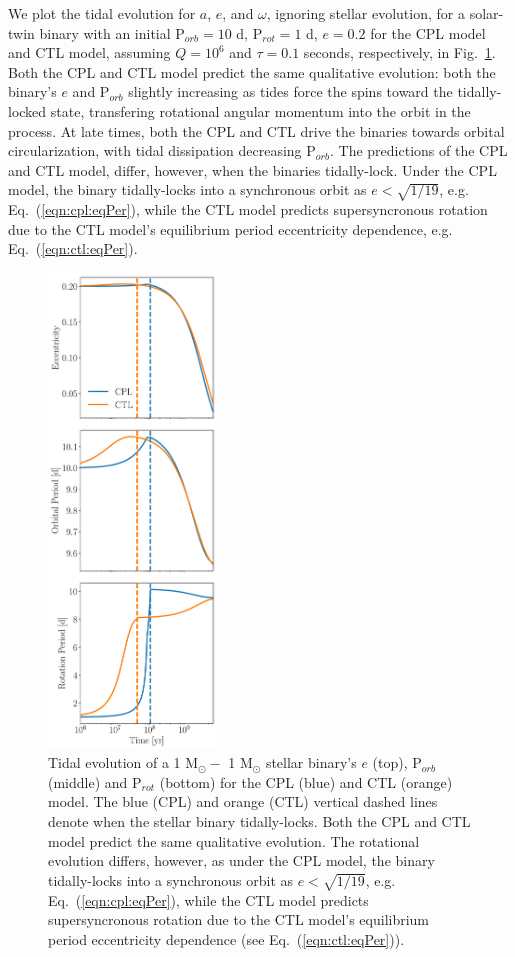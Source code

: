 \documentclass[twocolumn]{aastex61}
\begin{document}
We plot the tidal evolution for $a$, $e$, and $\omega$, ignoring stellar evolution, for a solar-twin binary with an initial P$_{orb} = 10$ d, P$_{rot} = 1$ d, $e = 0.2$ for the CPL model and CTL model, assuming $Q=10^6$ and $\tau = 0.1$ seconds, respectively, in Fig.~\ref{fig:tidalExample}. Both the CPL and CTL model predict the same qualitative evolution: both the binary's $e$ and P$_{orb}$ slightly increasing as tides force the spins toward the tidally-locked state, transfering rotational angular momentum into the orbit in the process.  At late times, both the CPL and CTL drive the binaries towards orbital circularization, with tidal dissipation decreasing P$_{orb}$. The predictions of the CPL and CTL model, differ, however, when the binaries tidally-lock.  Under the CPL model, the binary tidally-locks into a synchronous orbit as $e < \sqrt{1/19}$, e.g. Eq.~(\ref{eqn:cpl:eqPer}), while the CTL model predicts supersyncronous rotation due to the CTL model's equilibrium period eccentricity dependence, e.g. Eq.~(\ref{eqn:ctl:eqPer}).

\begin{figure}
	\includegraphics[width=0.4\textwidth]{../Plots/tidalExample.pdf}
   \caption{Tidal evolution of a 1 M$_{\odot} -$ 1 M$_{\odot}$ stellar binary's $e$ (top), P$_{orb}$ (middle) and P$_{rot}$ (bottom) for the CPL (blue) and CTL (orange) model. The blue (CPL) and orange (CTL) vertical dashed lines denote when the stellar binary tidally-locks. Both the CPL and CTL model predict the same qualitative evolution. The rotational evolution differs, however, as under the CPL model, the binary tidally-locks into a synchronous orbit as $e < \sqrt{1/19}$, e.g. Eq.~(\ref{eqn:cpl:eqPer}), while the CTL model predicts supersyncronous rotation due to the CTL model's equilibrium period eccentricity dependence (see Eq.~(\ref{eqn:ctl:eqPer})).}%
    \label{fig:tidalExample}%
\end{figure}
\end{document}
